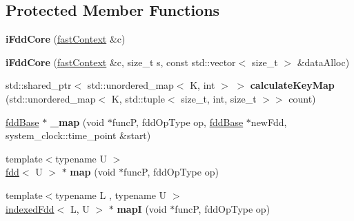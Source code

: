 \subsection*{Protected Member Functions}
\begin{DoxyCompactItemize}
\item 
\hypertarget{classfaster_1_1iFddCore_a5cdc2cf07bee57087e0997a0e140c9bd}{}{\bfseries i\+Fdd\+Core} (\hyperlink{classfaster_1_1fastContext}{fast\+Context} \&c)\label{classfaster_1_1iFddCore_a5cdc2cf07bee57087e0997a0e140c9bd}

\item 
\hypertarget{classfaster_1_1iFddCore_ab5be69b5752ab08168469e5baed451ef}{}{\bfseries i\+Fdd\+Core} (\hyperlink{classfaster_1_1fastContext}{fast\+Context} \&c, size\+\_\+t s, const std\+::vector$<$ size\+\_\+t $>$ \&data\+Alloc)\label{classfaster_1_1iFddCore_ab5be69b5752ab08168469e5baed451ef}

\item 
\hypertarget{classfaster_1_1iFddCore_a567b68967ed190bdba66479aba4fbf8a}{}std\+::shared\+\_\+ptr$<$ std\+::unordered\+\_\+map$<$ K, int $>$ $>$ {\bfseries calculate\+Key\+Map} (std\+::unordered\+\_\+map$<$ K, std\+::tuple$<$ size\+\_\+t, int, size\+\_\+t $>$$>$ count)\label{classfaster_1_1iFddCore_a567b68967ed190bdba66479aba4fbf8a}

\item 
\hypertarget{classfaster_1_1iFddCore_a483deae8e4c275dcbff0244ef33c2f4a}{}\hyperlink{classfaster_1_1fddBase}{fdd\+Base} $\ast$ {\bfseries \+\_\+map} (void $\ast$func\+P, fdd\+Op\+Type op, \hyperlink{classfaster_1_1fddBase}{fdd\+Base} $\ast$new\+Fdd, system\+\_\+clock\+::time\+\_\+point \&start)\label{classfaster_1_1iFddCore_a483deae8e4c275dcbff0244ef33c2f4a}

\item 
\hypertarget{classfaster_1_1iFddCore_ad09cdfbaed755fb7c54b80d3bb6a4f63}{}{\footnotesize template$<$typename U $>$ }\\\hyperlink{classfaster_1_1fdd}{fdd}$<$ U $>$ $\ast$ {\bfseries map} (void $\ast$func\+P, fdd\+Op\+Type op)\label{classfaster_1_1iFddCore_ad09cdfbaed755fb7c54b80d3bb6a4f63}

\item 
\hypertarget{classfaster_1_1iFddCore_a88bba48ad95225c4bceb986c13301212}{}{\footnotesize template$<$typename L , typename U $>$ }\\\hyperlink{classfaster_1_1indexedFdd}{indexed\+Fdd}$<$ L, U $>$ $\ast$ {\bfseries map\+I} (void $\ast$func\+P, fdd\+Op\+Type op)\label{classfaster_1_1iFddCore_a88bba48ad95225c4bceb986c13301212}

\end{DoxyCompactItemize}
